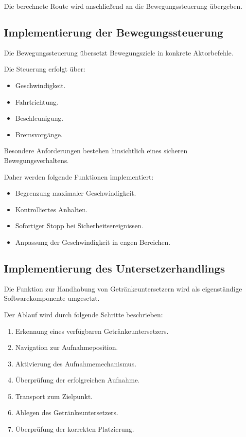 Die berechnete Route wird anschließend an die Bewegungssteuerung
übergeben.

\subsection{Implementierung der
Bewegungssteuerung}\label{implementierung-der-bewegungssteuerung}

Die Bewegungssteuerung übersetzt Bewegungsziele in konkrete
Aktorbefehle.

Die Steuerung erfolgt über:

\begin{itemize}
\tightlist
\item
  Geschwindigkeit.
\item
  Fahrtrichtung.
\item
  Beschleunigung.
\item
  Bremsvorgänge.
\end{itemize}

Besondere Anforderungen bestehen hinsichtlich eines sicheren
Bewegungsverhaltens.

Daher werden folgende Funktionen implementiert:

\begin{itemize}
\tightlist
\item
  Begrenzung maximaler Geschwindigkeit.
\item
  Kontrolliertes Anhalten.
\item
  Sofortiger Stopp bei Sicherheitsereignissen.
\item
  Anpassung der Geschwindigkeit in engen Bereichen.
\end{itemize}

\subsection{Implementierung des
Untersetzerhandlings}\label{implementierung-des-untersetzerhandlings}

Die Funktion zur Handhabung von Getränkeuntersetzern wird als
eigenständige Softwarekomponente umgesetzt.

Der Ablauf wird durch folgende Schritte beschrieben:

\begin{enumerate}
\def\labelenumi{\arabic{enumi}.}
\tightlist
\item
  Erkennung eines verfügbaren Getränkeuntersetzers.
\item
  Navigation zur Aufnahmeposition.
\item
  Aktivierung des Aufnahmemechanismus.
\item
  Überprüfung der erfolgreichen Aufnahme.
\item
  Transport zum Zielpunkt.
\item
  Ablegen des Getränkeuntersetzers.
\item
  Überprüfung der korrekten Platzierung.
\end{enumerate}

